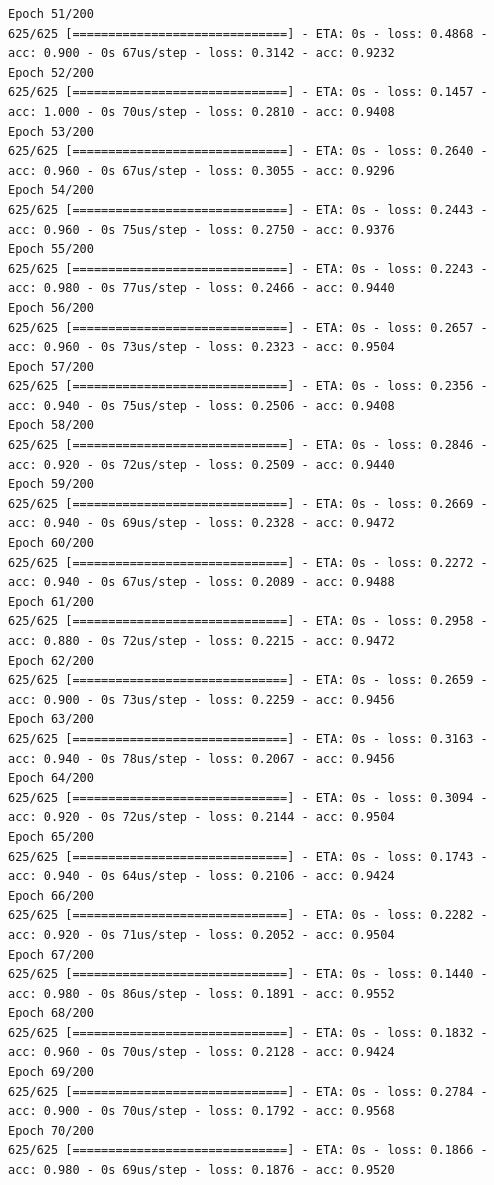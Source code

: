 \documentclass[11pt]{article}
\begin{document}
\begin{Verbatim}[commandchars=\\\{\}]
Epoch 51/200
625/625 [==============================] - ETA: 0s - loss: 0.4868 - acc: 0.900 - 0s 67us/step - loss: 0.3142 - acc: 0.9232
Epoch 52/200
625/625 [==============================] - ETA: 0s - loss: 0.1457 - acc: 1.000 - 0s 70us/step - loss: 0.2810 - acc: 0.9408
Epoch 53/200
625/625 [==============================] - ETA: 0s - loss: 0.2640 - acc: 0.960 - 0s 67us/step - loss: 0.3055 - acc: 0.9296
Epoch 54/200
625/625 [==============================] - ETA: 0s - loss: 0.2443 - acc: 0.960 - 0s 75us/step - loss: 0.2750 - acc: 0.9376
Epoch 55/200
625/625 [==============================] - ETA: 0s - loss: 0.2243 - acc: 0.980 - 0s 77us/step - loss: 0.2466 - acc: 0.9440
Epoch 56/200
625/625 [==============================] - ETA: 0s - loss: 0.2657 - acc: 0.960 - 0s 73us/step - loss: 0.2323 - acc: 0.9504
Epoch 57/200
625/625 [==============================] - ETA: 0s - loss: 0.2356 - acc: 0.940 - 0s 75us/step - loss: 0.2506 - acc: 0.9408
Epoch 58/200
625/625 [==============================] - ETA: 0s - loss: 0.2846 - acc: 0.920 - 0s 72us/step - loss: 0.2509 - acc: 0.9440
Epoch 59/200
625/625 [==============================] - ETA: 0s - loss: 0.2669 - acc: 0.940 - 0s 69us/step - loss: 0.2328 - acc: 0.9472
Epoch 60/200
625/625 [==============================] - ETA: 0s - loss: 0.2272 - acc: 0.940 - 0s 67us/step - loss: 0.2089 - acc: 0.9488
Epoch 61/200
625/625 [==============================] - ETA: 0s - loss: 0.2958 - acc: 0.880 - 0s 72us/step - loss: 0.2215 - acc: 0.9472
Epoch 62/200
625/625 [==============================] - ETA: 0s - loss: 0.2659 - acc: 0.900 - 0s 73us/step - loss: 0.2259 - acc: 0.9456
Epoch 63/200
625/625 [==============================] - ETA: 0s - loss: 0.3163 - acc: 0.940 - 0s 78us/step - loss: 0.2067 - acc: 0.9456
Epoch 64/200
625/625 [==============================] - ETA: 0s - loss: 0.3094 - acc: 0.920 - 0s 72us/step - loss: 0.2144 - acc: 0.9504
Epoch 65/200
625/625 [==============================] - ETA: 0s - loss: 0.1743 - acc: 0.940 - 0s 64us/step - loss: 0.2106 - acc: 0.9424
Epoch 66/200
625/625 [==============================] - ETA: 0s - loss: 0.2282 - acc: 0.920 - 0s 71us/step - loss: 0.2052 - acc: 0.9504
Epoch 67/200
625/625 [==============================] - ETA: 0s - loss: 0.1440 - acc: 0.980 - 0s 86us/step - loss: 0.1891 - acc: 0.9552
Epoch 68/200
625/625 [==============================] - ETA: 0s - loss: 0.1832 - acc: 0.960 - 0s 70us/step - loss: 0.2128 - acc: 0.9424
Epoch 69/200
625/625 [==============================] - ETA: 0s - loss: 0.2784 - acc: 0.900 - 0s 70us/step - loss: 0.1792 - acc: 0.9568
Epoch 70/200
625/625 [==============================] - ETA: 0s - loss: 0.1866 - acc: 0.980 - 0s 69us/step - loss: 0.1876 - acc: 0.9520

\end{Verbatim}
\end{document}
